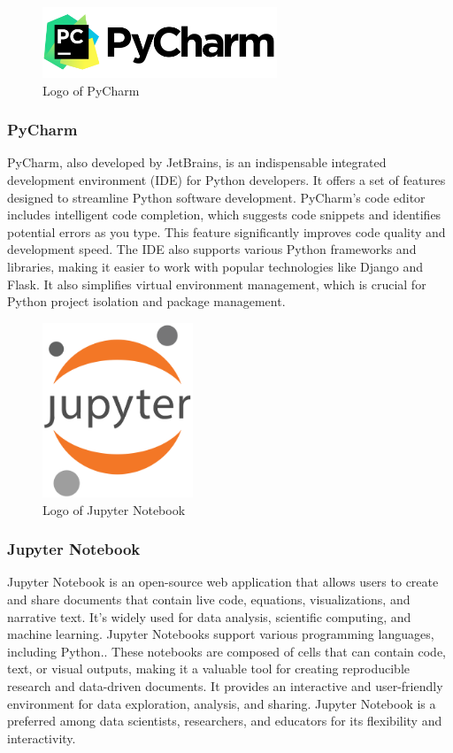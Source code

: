 \documentclass[conference]{IEEEtran}
\begin{document}
        \begin{figure}[htbp]
        \centerline{\includegraphics[width=7cm]{Images/logo/pycharm.png}}
        \label{fig}
        \caption{Logo of PyCharm}
        \end{figure}
        \subsubsection{PyCharm}
        PyCharm, also developed by JetBrains, is an indispensable integrated development environment (IDE) for Python developers. It offers a set of features designed to streamline Python software development. PyCharm's code editor includes intelligent code completion, which suggests code snippets and identifies potential errors as you type. This feature significantly improves code quality and development speed. The IDE also supports various Python frameworks and libraries, making it easier to work with popular technologies like Django and Flask. It also simplifies virtual environment management, which is crucial for Python project isolation and package management.\\
        
        \begin{figure}[htbp]
        \centerline{\includegraphics[width=4.5cm]{Images/logo/jupyter.png}}
        \label{fig}
        \caption{Logo of Jupyter Notebook}
        \end{figure}
        \subsubsection{Jupyter Notebook}
        Jupyter Notebook is an open-source web application that allows users to create and share documents that contain live code, equations, visualizations, and narrative text. It's widely used for data analysis, scientific computing, and machine learning. Jupyter Notebooks support various programming languages, including Python.. These notebooks are composed of cells that can contain code, text, or visual outputs, making it a valuable tool for creating reproducible research and data-driven documents. It provides an interactive and user-friendly environment for data exploration, analysis, and sharing. Jupyter Notebook is a preferred among data scientists, researchers, and educators for its flexibility and interactivity.\\
\end{document}
